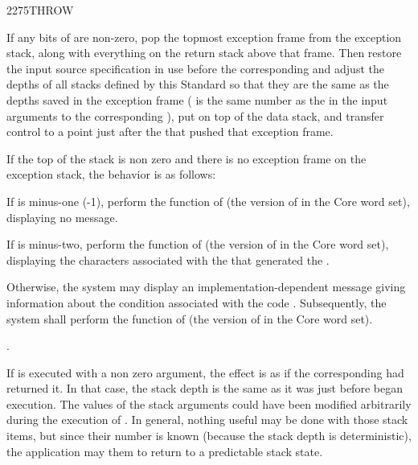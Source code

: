 \begin{worddef}{2275}{THROW}
\item {}

	If any bits of  are non-zero, pop the topmost exception
	frame from the exception stack, along with everything on the
	return stack above that frame. Then restore the input source
	specification in use before the corresponding 
	and adjust the depths of all stacks defined by this Standard
	so that they are the same as the depths saved in the exception
	frame ( is the same number as the  in the input
	arguments to the corresponding ), put  on
	top of the data stack, and transfer control to a point just after
	the  that pushed that exception frame.

	If the top of the stack is non zero and there is no exception
	frame on the exception stack, the behavior is as follows:

	If  is minus-one (-1), perform the function of
	 (the version of  in
	the Core word set), displaying no message.

	If  is minus-two, perform the function of
	 (the version of 
	in the Core word set), displaying the characters 
	associated with the  that generated the
	.

	Otherwise, the system may display an implementation-dependent
	message giving information about the condition associated with
	the  code . Subsequently, the system shall
	perform the function of  (the version
	of  in the Core word set).

\see {}.

	\begin{rationale} %
		If  is executed with a non zero argument, the effect
		is as if the corresponding  had returned it. In that
		case, the stack depth is the same as it was just before 
		began execution. The values of the  stack arguments could
		have been modified arbitrarily during the execution of .
		In general, nothing useful may be done with those stack items, but
		since their number is known (because the stack depth is deterministic),
		the application may  them to return to a predictable
		stack state.


\end{rationale}
\end{worddef}
